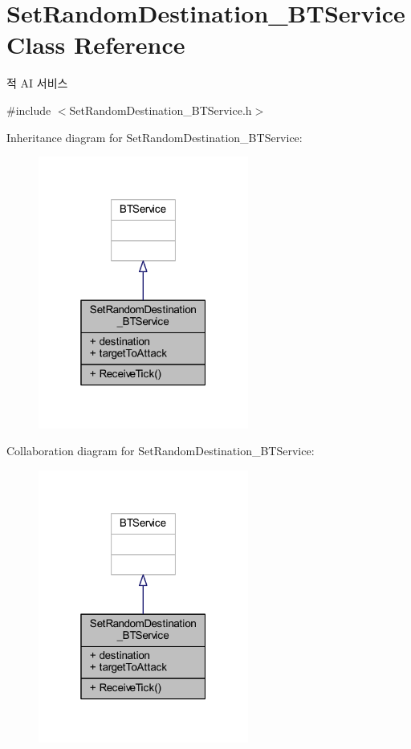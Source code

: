 \hypertarget{class_set_random_destination___b_t_service}{}\section{Set\+Random\+Destination\+\_\+\+B\+T\+Service Class Reference}
\label{class_set_random_destination___b_t_service}


적 AI 서비스  




{\ttfamily \#include $<$Set\+Random\+Destination\+\_\+\+B\+T\+Service.\+h$>$}



Inheritance diagram for Set\+Random\+Destination\+\_\+\+B\+T\+Service\+:\nopagebreak
\begin{figure}[H]
\begin{center}
\leavevmode
\includegraphics[width=196pt]{class_set_random_destination___b_t_service__inherit__graph}
\end{center}
\end{figure}


Collaboration diagram for Set\+Random\+Destination\+\_\+\+B\+T\+Service\+:\nopagebreak
\begin{figure}[H]
\begin{center}
\leavevmode
\includegraphics[width=196pt]{class_set_random_destination___b_t_service__coll__graph}
\end{center}
\end{figure}
